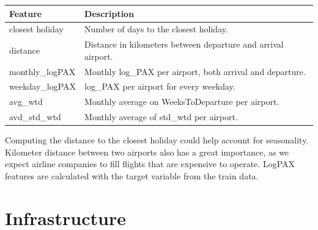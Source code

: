 \documentclass[a4paper,12pt,twoside]{article}
\begin{document}
\begin{table}[H]
	\centering
	\begin{tabular}{|l|l|}
	\hline
	\textbf{Feature} & \textbf{Description}                        \\ \hline
	closest holiday  & Number of days to the closest holiday.\\ \hline
	distance      	 & Distance in kilometers between departure and arrival airport.\\ \hline
	monthly\_logPAX   & Monthly log\_PAX per airport, both arrival and departure.  \\ \hline
	weekday\_logPAX   & log\_PAX per airport for every weekday.                    \\ \hline
	avg\_wtd          & Monthly average on WeeksToDeparture per airport.           \\ \hline
	avd\_std\_wtd      & Monthly average of std\_wtd per airport.                   \\ \hline
	\end{tabular}
	\label{table:feature_engineering}
\end{table}
Computing the distance to the closest holiday could help account for seasonality. Kilometer distance between two airports also has a great importance, as we expect airline companies to fill flights that are expensive to operate. LogPAX features are calculated with the target variable from the train data.

\section{Infrastructure} 
\end{document}
